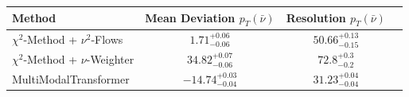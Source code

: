     \begin{tabular}{lccc}
        \toprule
        Method & Mean Deviation $p_{T}(\bar{\nu})$ & Resolution $p_{T}(\bar{\nu})$ \\
        \midrule
        $\chi^2$-Method + $\nu^2$-Flows & $1.71^{+0.06}_{-0.06}$ & $50.66^{+0.13}_{-0.15}$ \\
        $\chi^2$-Method + $\nu$-Weighter & $34.82^{+0.07}_{-0.06}$ & $72.8^{+0.3}_{-0.2}$ \\
        MultiModalTransformer & $-14.74^{+0.03}_{-0.04}$ & $31.23^{+0.04}_{-0.04}$ \\
        \bottomrule
    \end{tabular}